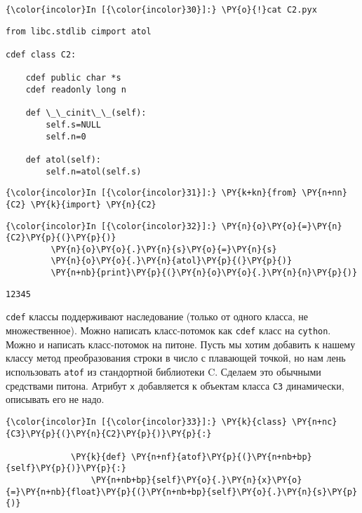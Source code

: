     \begin{Verbatim}[commandchars=\\\{\}]
{\color{incolor}In [{\color{incolor}30}]:} \PY{o}{!}cat C2.pyx
\end{Verbatim}

    \begin{Verbatim}[commandchars=\\\{\}]
from libc.stdlib cimport atol

cdef class C2:

    cdef public char *s
    cdef readonly long n

    def \_\_cinit\_\_(self):
        self.s=NULL
        self.n=0

    def atol(self):
        self.n=atol(self.s)

    \end{Verbatim}

    \begin{Verbatim}[commandchars=\\\{\}]
{\color{incolor}In [{\color{incolor}31}]:} \PY{k+kn}{from} \PY{n+nn}{C2} \PY{k}{import} \PY{n}{C2}
\end{Verbatim}

    \begin{Verbatim}[commandchars=\\\{\}]
{\color{incolor}In [{\color{incolor}32}]:} \PY{n}{o}\PY{o}{=}\PY{n}{C2}\PY{p}{(}\PY{p}{)}
         \PY{n}{o}\PY{o}{.}\PY{n}{s}\PY{o}{=}\PY{n}{s}
         \PY{n}{o}\PY{o}{.}\PY{n}{atol}\PY{p}{(}\PY{p}{)}
         \PY{n+nb}{print}\PY{p}{(}\PY{n}{o}\PY{o}{.}\PY{n}{n}\PY{p}{)}
\end{Verbatim}

    \begin{Verbatim}[commandchars=\\\{\}]
12345

    \end{Verbatim}

    \texttt{cdef} классы поддерживают наследование (только от одного класса,
не множественное). Можно написать класс-потомок как \texttt{cdef} класс
на \texttt{cython}. Можно и написать класс-потомок на питоне. Пусть мы
хотим добавить к нашему классу метод преобразования строки в число с
плавающей точкой, но нам лень использовать \texttt{atof} из стандортной
библиотеки C. Сделаем это обычными средствами питона. Атрибут \texttt{x}
добавляется к объектам класса \texttt{C3} динамически, описывать его не
надо.

    \begin{Verbatim}[commandchars=\\\{\}]
{\color{incolor}In [{\color{incolor}33}]:} \PY{k}{class} \PY{n+nc}{C3}\PY{p}{(}\PY{n}{C2}\PY{p}{)}\PY{p}{:}
             
             \PY{k}{def} \PY{n+nf}{atof}\PY{p}{(}\PY{n+nb+bp}{self}\PY{p}{)}\PY{p}{:}
                 \PY{n+nb+bp}{self}\PY{o}{.}\PY{n}{x}\PY{o}{=}\PY{n+nb}{float}\PY{p}{(}\PY{n+nb+bp}{self}\PY{o}{.}\PY{n}{s}\PY{p}{)}
\end{Verbatim}

